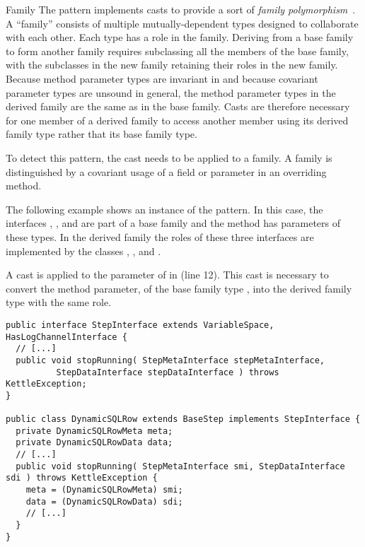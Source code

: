 \begin{pattern}{Family}
  The \thisp{} pattern implements casts
  to provide a sort of
  \emph{family
polymorphism}~\citep{ernstFamilyPolymorphism2001}.
A ``family'' consists of
multiple mutually-dependent types designed to collaborate with each other.
Each type has a role in the family.
  Deriving from a base family to form another
  family requires subclassing all the members of the base family, with the
  subclasses in the new family retaining their roles in the new family.
  Because method parameter types are invariant in \java{} and because
  covariant parameter types are unsound in general, the
  method parameter types in the
  derived family are the same as in the base family.
  Casts are therefore necessary for one member of a derived family to access
  another member using its derived family type rather that its base family
  type.

To detect this pattern, the cast needs to be applied to a family.
A family is distinguished by a covariant usage of a field or parameter in an overriding method.

\instances{}
The following example%
\def\urlvar{http://bit.ly/pentaho_pentaho_kettle_2FN59J8}
shows an instance of the \thisp{} pattern.
%
  In this case, the interfaces , ,
  and  are part of a base family and the
   method has parameters of these types.
  In the derived family the roles of these three interfaces are
  implemented by the classes
  ,
  , and
  .

A cast is applied to the parameter  of  in
 (line 12). This cast is necessary to convert the
method parameter, of the base
family type , into the derived family type with the
same role.

\begin{verbatim}
public interface StepInterface extends VariableSpace, HasLogChannelInterface {
  // [...]
  public void stopRunning( StepMetaInterface stepMetaInterface,
          StepDataInterface stepDataInterface ) throws KettleException;
}

public class DynamicSQLRow extends BaseStep implements StepInterface {
  private DynamicSQLRowMeta meta;
  private DynamicSQLRowData data;
  // [...]
  public void stopRunning( StepMetaInterface smi, StepDataInterface sdi ) throws KettleException {
    meta = (DynamicSQLRowMeta) smi;
    data = (DynamicSQLRowData) sdi;
    // [...]
  }
}
\end{verbatim}


\end{pattern}

